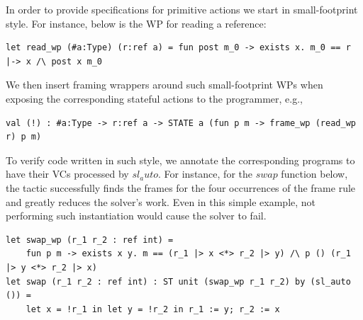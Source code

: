 \documentclass[runningheads]{llncs}
\newcommand\fstar{F$^\star$\xspace}
\newcommand{\comm}[3]{\ifcheckpagebudget\else\ifdraft{{\color{#1}[#2: #3]}}\fi\fi}
\newcommand{\da}[1]{\comm{dkyellow}{Danel}{#1}}
\begin{document}
In order to provide specifications for primitive
actions we start in small-footprint style.
%
For instance, below is the WP for reading a reference:
%
\begin{lstlisting}
let read_wp (#a:Type) (r:ref a) = fun post m_0 -> exists x. m_0 == r |-> x /\ post x m_0
\end{lstlisting}
%
We then insert framing wrappers around such small-footprint WPs when
exposing the corresponding stateful actions to the programmer, e.g.,
\begin{lstlisting}
val (!) : #a:Type -> r:ref a -> STATE a (fun p m -> frame_wp (read_wp r) p m)
\end{lstlisting}
%
%
To verify code written in such style, we annotate the corresponding 
programs to have their VCs processed by \ls$sl_auto$. For instance, 
for the \ls$swap$ function below, the tactic  
successfully finds the frames for the four occurrences of
the frame rule and greatly reduces the solver's work.
%
%
Even in this simple example, not performing such instantiation would cause
the solver to fail.
%
\begin{lstlisting}
let swap_wp (r_1 r_2 : ref int) =
    fun p m -> exists x y. m == (r_1 |> x <*> r_2 |> y) /\ p () (r_1 |> y <*> r_2 |> x)
let swap (r_1 r_2 : ref int) : ST unit (swap_wp r_1 r_2) by (sl_auto ()) =
    let x = !r_1 in let y = !r_2 in r_1 := y; r_2 := x
\end{lstlisting}
%
%



%
\end{document}
